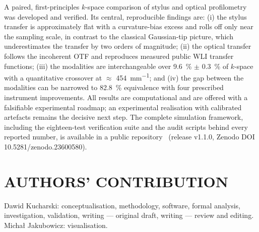 \documentclass{imeko_wc}
\begin{document}
\label{sec:conclusions}
A paired, first-principles $k$-space comparison of stylus and optical profilometry was developed and verified. Its central, reproducible findings are: (i) the stylus transfer is approximately flat with a curvature-bias excess and rolls off only near the sampling scale, in contrast to the classical Gaussian-tip picture, which underestimates the transfer by two orders of magnitude; (ii) the optical transfer follows the incoherent OTF and reproduces measured public WLI transfer functions; (iii) the modalities are interchangeable over \qty{9.6}{\percent} $\pm$ \qty{0.3}{\percent} of $k$-space with a quantitative crossover at $\approx$ \qty{454}{mm^{-1}}; and (iv) the gap between the modalities can be narrowed to \qty{82.8}{\percent} equivalence with four prescribed instrument improvements. All results are computational and are offered with a falsifiable experimental roadmap; an experimental realisation with calibrated artefacts remains the decisive next step. The complete simulation framework, including the eighteen-test verification suite and the audit scripts behind every reported number, is available in a public repository~\cite{kucharski2026repository} (release v1.1.0, Zenodo DOI 10.5281/zenodo.23600580).

\section*{AUTHORS' CONTRIBUTION}

Dawid Kucharski: conceptualisation, methodology, software, formal analysis, investigation, validation, writing --- original draft, writing --- review and editing. Micha{\l} Jakubowicz: visualisation.



\end{document}
